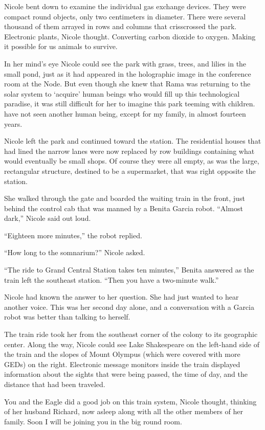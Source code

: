 \documentclass[]{article}
\begin{document}
{Nicole bent down to examine the individual gas exchange devices.  They were compact round objects, only two centimeters in diameter.  There were several thousand of them arrayed in rows and columns that crisscrossed the park.  Electronic plants, Nicole thought.  Converting carbon dioxide to oxygen.  Making it possible for us animals to survive.

In her mind’s eye Nicole could see the park with grass, trees, and lilies in the small pond, just as it had appeared in the holographic image in the conference room at the Node.  But even though she knew that Rama was returning to the solar system to  ‘acquire' human beings who would fill up this technological paradise, it was still difficult for her to imagine this park teeming with children.  have not seen another human being, except for my family, in almost fourteen years.

Nicole left the park and continued toward the station.  The residential houses that had lined the narrow lanes were now replaced by row buildings containing what would eventually be small shops.  Of course they were all empty, as was the large, rectangular structure, destined to be a supermarket, that was right opposite the station.

She walked through the gate and boarded the waiting train in the front, just behind the control cab that was manned by a Benita Garcia robot.  “Almost dark,” Nicole said out loud.

“Eighteen more minutes,” the robot replied.

“How long to the somnarium?” Nicole asked.

“The ride to Grand Central Station takes ten minutes,” Benita answered as the train left the southeast station.  “Then you have a two-minute walk.”

Nicole had known the answer to her question.  She had just wanted to hear another voice.  This was her second day alone, and a conversation with a Garcia robot was better than talking to herself.

The train ride took her from the southeast corner of the colony to its geographic center.  Along the way, Nicole could see Lake Shakespeare on the left-hand side of the train and the slopes of Mount Olympus (which were covered with more GEDs) on the right.  Electronic message monitors inside the train displayed information about the sights that were being passed, the time of day, and the distance that had been traveled.

You and the Eagle did a good job on this train system, Nicole thought, thinking of her husband Richard, now asleep along with all the other members of her family.  Soon I will be joining you in the big round room.

}
\end{document}
